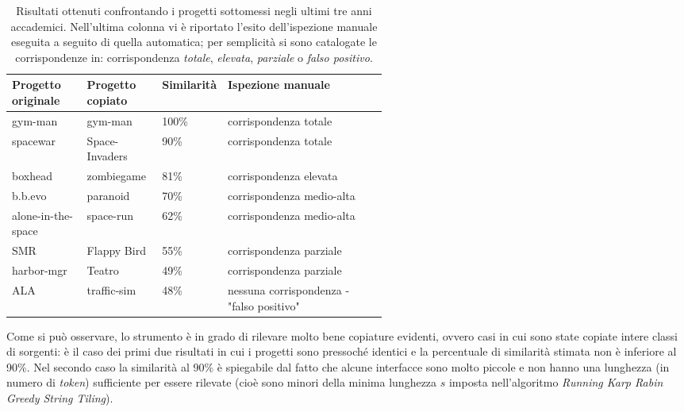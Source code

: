 \begin{table}[h!]
    \centering
    \begin{tabular}{|p{0.2\linewidth}|p{0.2\linewidth}|p{0.15\linewidth}|p{}|}
        \hline
        \textbf{Progetto originale} & \textbf{Progetto copiato} & \textbf{Similarità} & \textbf{Ispezione manuale} \\ [0.5ex] 
        \hline\hline
        gym-man & gym-man & 100\% & corrispondenza totale \\
        \hline
        spacewar & Space-Invaders & 90\% & corrispondenza totale \\
        \hline
        boxhead & zombiegame & 81\% & corrispondenza elevata \\
        \hline
        b.b.evo & paranoid & 70\% & corrispondenza medio-alta \\
        \hline
        alone-in-the-space & space-run & 62\% & corrispondenza medio-alta \\
        \hline
        SMR & Flappy Bird & 55\% & corrispondenza parziale \\
        \hline
        harbor-mgr & Teatro & 49\% & corrispondenza parziale \\
        \hline
        ALA & traffic-sim & 48\% & nessuna corrispondenza - "falso positivo" \\
        \hline
    \end{tabular}
    \caption[Risultati ottenuti confrontando i progetti sottomessi negli ultimi tre anni accademici]{Risultati ottenuti confrontando i progetti sottomessi negli ultimi tre anni accademici. Nell'ultima colonna vi è riportato l'esito dell'ispezione manuale eseguita a seguito di quella automatica; per semplicità si sono catalogate le corrispondenze in: corrispondenza \textit{totale}, \textit{elevata}, \textit{parziale} o \textit{falso positivo}.}
    \label{table:results}
\end{table}

Come si può osservare, lo strumento è in grado di rilevare molto bene copiature evidenti, ovvero casi in cui sono state copiate intere classi di sorgenti: è il caso dei primi due risultati in cui i progetti sono pressoché identici e la percentuale di similarità stimata non è inferiore al 90\%.
%
Nel secondo caso la similarità al 90\% è spiegabile dal fatto che alcune interfacce sono molto piccole e non hanno una lunghezza (in numero di \textit{token}) sufficiente per essere rilevate (cioè sono minori della minima lunghezza $s$ imposta nell'algoritmo \textit{Running Karp Rabin Greedy String Tiling}).

